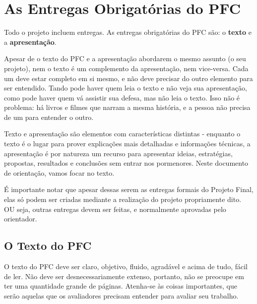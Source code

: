
\chapter{As Entregas Obrigatórias do PFC}

Todo o projeto incluem entregas. As entregas obrigatórias do PFC são: o \textbf{texto} e a \textbf{apresentação}.

Apesar de o texto do PFC e a apresentação abordarem o mesmo assunto (o seu projeto), nem o texto é um complemento da apresentação, nem vice-versa. Cada um deve estar completo em si mesmo, e não deve precisar do outro elemento para ser entendido.
Tando pode haver quem leia o texto e não veja sua apresentação, como pode haver quem vá assistir sua defesa, mas não leia o texto. Isso não é problema: há livros e filmes que narram a mesma história, e a pessoa não precisa de um para entender o outro.

Texto e apresentação são elementos com características distintas - enquanto o texto é o lugar para prover explicações mais detalhadas e informações técnicas, a apresentação é por natureza um recurso para apresentar ideias, estratégias, propostas, resultados e conclusões sem entrar nos pormenores. Neste documento de orientação, vamos focar no texto.

É importante notar que apesar dessas serem as entregas formais do Projeto Final, elas só podem ser criadas mediante a realização do projeto propriamente dito. OU seja, outras entregas devem ser feitas, e normalmente aprovadas pelo orientador.

\section{ O Texto do PFC}

O texto do PFC deve ser claro, objetivo, fluido, agradável e acima de tudo, fácil de ler. Não deve ser desnecessariamente extenso, portanto, não se preocupe em ter uma quantidade grande de páginas. Atenha-se às coisas importantes, que serão aquelas que os avaliadores precisam entender para avaliar seu trabalho.

